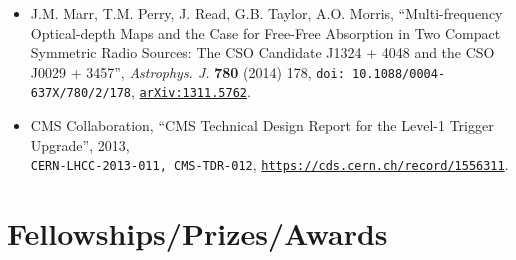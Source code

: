 \documentclass[letterpaper,11pt]{article} %
\begin{document}
\begin{itemize}
\item J.M. Marr, T.M. Perry, J. Read, G.B. Taylor, A.O. Morris, 
  ``Multi-frequency Optical-depth Maps and the Case for
  Free-Free Absorption in Two Compact Symmetric Radio
  Sources: The CSO Candidate J1324 + 4048 and the CSO J0029
  + 3457'',
  \emph{Astrophys. J.} {\bf 780} (2014) 178, 
  \texttt{doi: 10.1088/0004-637X/780/2/178},
  \texttt{\href{http://arxiv.org/abs/1311.5762}{arXiv:1311.5762}}.

\item CMS Collaboration, 
  ``CMS Technical Design Report for the Level-1 Trigger Upgrade'',
  2013,  \\
  \texttt{CERN-LHCC-2013-011, CMS-TDR-012},
  \texttt{\href{https://cds.cern.ch/record/1556311}{https://cds.cern.ch/record/1556311}}.

\end{itemize}



\section{Fellowships/Prizes/Awards}
\end{document}

